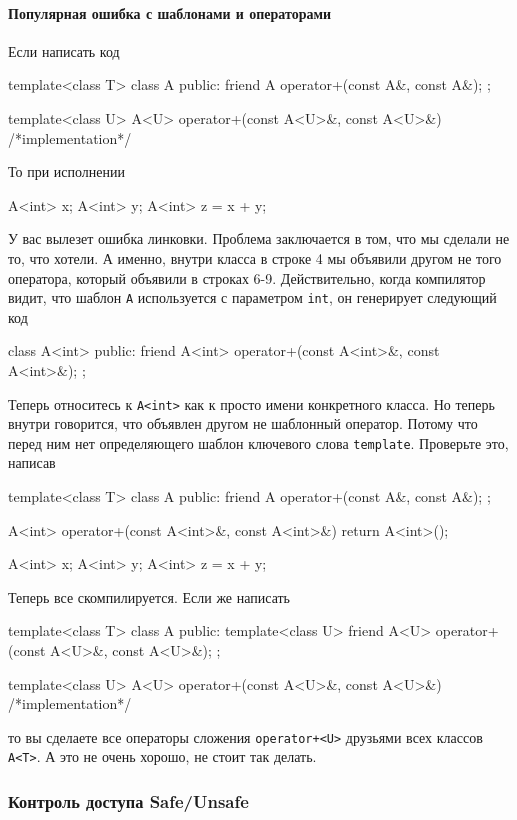 \paragraph{Популярная ошибка с шаблонами и операторами}
Если написать код
\begin{cppcode}
template<class T>
class A {
public:
  friend A operator+(const A&, const A&);
};

template<class U>
A<U> operator+(const A<U>&, const A<U>&) {
  /*implementation*/
}
\end{cppcode}
То при исполнении
\begin{cppcode}
A<int> x;
A<int> y;
A<int> z = x + y;
\end{cppcode}
У вас вылезет ошибка линковки.
Проблема заключается в том, что мы сделали не то, что хотели.
А именно, внутри класса в строке 4 мы объявили другом не того оператора, который объявили в строках 6-9.
Действительно, когда компилятор видит, что шаблон \verb"A" используется с параметром \verb"int", он генерирует следующий код
\begin{cppcode}
class A<int> {
public:
  friend A<int> operator+(const A<int>&, const A<int>&);
};
\end{cppcode}
Теперь относитесь к \verb"A<int>" как к просто имени конкретного класса.
Но теперь внутри говорится, что объявлен другом не шаблонный оператор.
Потому что перед ним нет определяющего шаблон ключевого слова \verb"template".
Проверьте это, написав
\begin{cppcode}
template<class T>
class A {
public:
  friend A operator+(const A&, const A&);
};

A<int> operator+(const A<int>&, const A<int>&) {
  return A<int>();
}

A<int> x;
A<int> y;
A<int> z = x + y;
\end{cppcode}
Теперь все скомпилируется.
Если же написать
\begin{cppcode}
template<class T>
class A {
public:
  template<class U>
  friend A<U> operator+(const A<U>&, const A<U>&);
};

template<class U>
A<U> operator+(const A<U>&, const A<U>&) {
  /*implementation*/
}
\end{cppcode}
то вы сделаете все операторы сложения \verb"operator+<U>" друзьями всех классов \verb"A<T>".
А это не очень хорошо, не стоит так делать.

\subsubsection{Контроль доступа Safe/Unsafe}
\label{section::SafeUnsafe}

